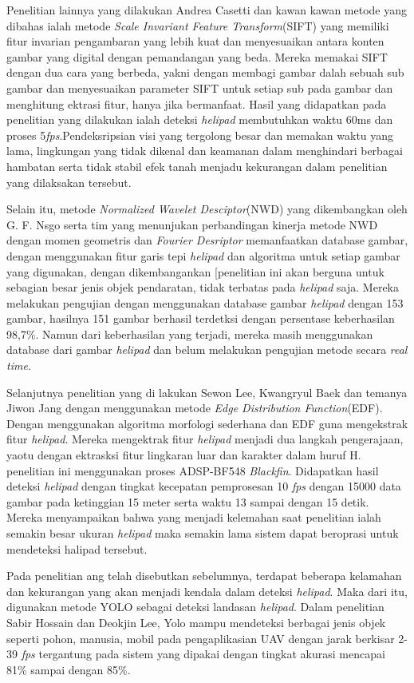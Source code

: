 Penelitian lainnya yang dilakukan Andrea Casetti dan kawan kawan metode yang dibahas ialah metode \textit{Scale Invariant Feature Transform}(SIFT) yang memiliki fitur invarian pengambaran yang lebih kuat dan menyesuaikan antara konten gambar yang digital dengan pemandangan yang beda. Mereka memakai SIFT dengan dua cara yang berbeda, yakni dengan membagi gambar dalah sebuah sub gambar dan menyesuaikan parameter SIFT untuk setiap sub pada gambar dan menghitung ektrasi fitur, hanya jika bermanfaat. Hasil yang didapatkan pada penelitian yang dilakukan ialah deteksi \textit{helipad} membutuhkan waktu 60ms dan proses 5\textit{fps}.Pendeksripsian visi yang tergolong besar dan memakan waktu yang lama, lingkungan yang tidak dikenal dan keamanan dalam menghindari berbagai hambatan serta tidak stabil efek tanah menjadu kekurangan dalam penelitian yang dilaksakan tersebut\cite{cesetti2009vision}.

Selain itu, metode \textit{Normalized Wavelet Desciptor}(NWD) yang dikembangkan oleh G. F. Nsgo serta tim yang menunjukan perbandingan kinerja metode NWD dengan momen geometris dan \textit{Fourier Desriptor} memanfaatkan database gambar, dengan menggunakan fitur garis tepi \textit{helipad} dan algoritma untuk setiap gambar yang digunakan, dengan dikembangankan [penelitian ini akan berguna untuk sebagian besar jenis objek pendaratan, tidak terbatas pada \textit{helipad} saja. Mereka melakukan pengujian dengan menggunakan database gambar \textit{helipad} dengan 153 gambar, hasilnya 151 gambar berhasil terdetksi dengan persentase keberhasilan 98,7\%\cite{nsogo2007robust}. Namun dari keberhasilan yang terjadi, mereka masih menggunakan database dari gambar \textit{helipad} dan belum melakukan pengujian metode secara \textit{real time.}

Selanjutnya penelitian yang di lakukan Sewon Lee, Kwangryul Baek dan temanya Jiwon Jang dengan menggunakan metode \textit{Edge Distribution Function}(EDF)\cite{lee2012implementation}. Dengan menggunakan algoritma morfologi sederhana dan EDF guna mengekstrak fitur \textit{helipad}. Mereka mengektrak fitur \textit{helipad} menjadi dua langkah pengerajaan, yaotu dengan ektrasksi fitur lingkaran luar dan karakter dalam huruf H. penelitian ini menggunakan proses ADSP-BF548 \textit{Blackfin}. Didapatkan hasil deteksi \textit{helipad} dengan tingkat kecepatan pemprosesan 10 \textit{fps} dengan 15000 data gambar pada ketinggian 15 meter serta waktu 13 sampai dengan 15 detik. Mereka menyampaikan bahwa yang menjadi kelemahan saat penelitian ialah semakin besar ukuran \textit{helipad} maka semakin lama sistem dapat beroprasi untuk mendeteksi halipad tersebut.

Pada penelitian ang telah disebutkan sebelumnya, terdapat beberapa kelamahan dan kekurangan yang akan menjadi kendala dalam deteksi \textit{helipad}. Maka dari itu, digunakan metode YOLO sebagai deteksi landasan \textit{helipad}. Dalam penelitian Sabir Hossain dan Deokjin Lee\cite{hossain2019deep}, Yolo mampu mendeteksi berbagai jenis objek seperti pohon, manusia, mobil pada pengaplikasian UAV dengan jarak berkisar 2-39 \textit{fps} tergantung pada sistem yang dipakai dengan tingkat akurasi mencapai 81\% sampai dengan 85\%.